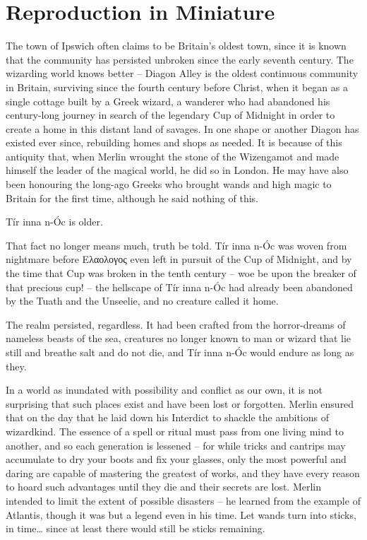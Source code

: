 \hypertarget{reproduction-in-miniature}{%
\chapter{Reproduction in Miniature}\label{reproduction-in-miniature}}

The town of Ipswich often claims to be Britain's oldest town, since it
is known that the community has persisted unbroken since the early
seventh century. The wizarding world knows better -- Diagon Alley is the
oldest continuous community in Britain, surviving since the fourth
century before Christ, when it began as a single cottage built by a
Greek wizard, a wanderer who had abandoned his century-long journey in
search of the legendary Cup of Midnight in order to create a home in
this distant land of savages. In one shape or another Diagon has existed
ever since, rebuilding homes and shops as needed. It is because of this
antiquity that, when Merlin wrought the stone of the Wizengamot and made
himself the leader of the magical world, he did so in London. He may
have also been honouring the long-ago Greeks who brought wands and high
magic to Britain for the first time, although he said nothing of this.

Tír inna n-Óc is older.

That fact no longer means much, truth be told. Tír inna n-Óc was woven
from nightmare before \foreignlanguage{greek}{\textgreek{Ελαολογος}}
even left in pursuit of the Cup of Midnight, and by the time that Cup
was broken in the tenth century -- woe be upon the breaker of that
precious cup! -- the hellscape of Tír inna n-Óc had already been
abandoned by the Tuath and the Unseelie, and no creature called it home.

The realm persisted, regardless. It had been crafted from the
horror-dreams of nameless beasts of the sea, creatures no longer known
to man or wizard that lie still and breathe salt and do not die, and Tír
inna n-Óc would endure as long as they.

In a world as inundated with possibility and conflict as our own, it is
not surprising that such places exist and have been lost or forgotten.
Merlin ensured that on the day that he laid down his Interdict to
shackle the ambitions of wizardkind. The essence of a spell or ritual
must pass from one living mind to another, and so each generation is
lessened -- for while tricks and cantrips may accumulate to dry your
boots and fix your glasses, only the most powerful and daring are
capable of mastering the greatest of works, and they have every reason
to hoard such advantages until they die and their secrets are lost.
Merlin intended to limit the extent of possible disasters -- he learned
from the example of Atlantis, though it was but a legend even in his
time. Let wands turn into sticks, in time\ldots{} since at least there
would still be sticks remaining.

